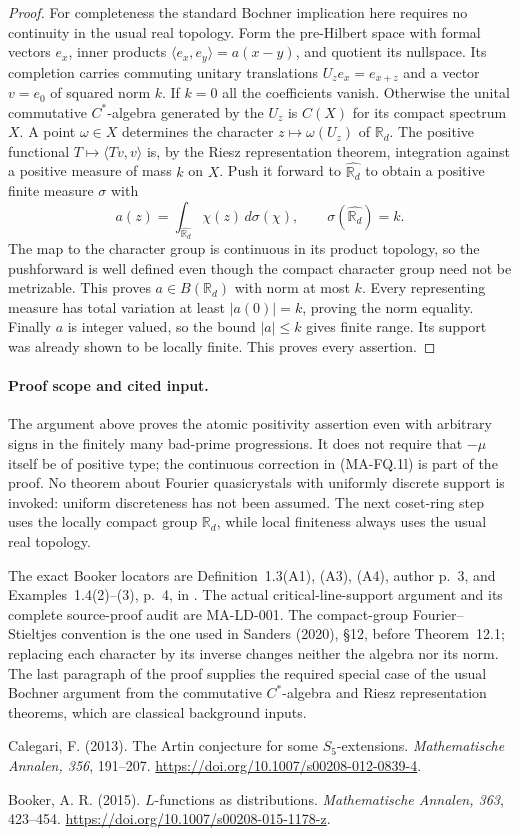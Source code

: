 \begin{proof}
For completeness the standard Bochner implication here requires
no continuity in the usual real topology. Form the pre-Hilbert
space with formal vectors $e_x$, inner products
$\langle e_x,e_y\rangle=a(x-y)$, and quotient its nullspace.
Its completion carries commuting unitary translations
$U_z e_x=e_{x+z}$ and a vector $v=e_0$ of squared norm $k$.
If $k=0$ all the coefficients vanish. Otherwise the unital
commutative $C^*$-algebra generated by the $U_z$ is $C(X)$
for its compact spectrum $X$. A point $\omega\in X$ determines
the character $z\mapsto\omega(U_z)$ of $\mathbb R_d$.
The positive functional $T\mapsto\langle Tv,v\rangle$ is,
by the Riesz representation theorem, integration against a
positive measure of mass $k$ on $X$. Push it forward to
$\widehat{\mathbb R_d}$ to obtain a positive finite measure
$\sigma$ with
\[
        a(z)=\int_{\widehat{\mathbb R_d}}\chi(z)\,d\sigma(\chi),
        \qquad \sigma(\widehat{\mathbb R_d})=k.
 \tag{MA-FQ.1p}
\]
The map to the character group is continuous in its product
topology, so the pushforward is well defined even though the
compact character group need not be metrizable. This proves
$a\in B(\mathbb R_d)$ with norm at most $k$. Every representing
measure has total variation at least $|a(0)|=k$, proving the
norm equality. Finally $a$ is integer valued, so the bound
$|a|\le k$ gives finite range. Its support was already shown
to be locally finite. This proves every assertion.
\end{proof}

\paragraph{Proof scope and cited input.}
The argument above proves the atomic positivity assertion even
with arbitrary signs in the finitely many bad-prime progressions.
It does not require that $-\mu$ itself be of positive type;
the continuous correction in (MA-FQ.1l) is part of the proof.
No theorem about Fourier quasicrystals with uniformly discrete
support is invoked: uniform discreteness has not been assumed.
The next coset-ring step uses the locally compact group
$\mathbb R_d$, while local finiteness always uses the usual
real topology.

The exact Booker locators are Definition~1.3(A1), (A3), (A4),
author p.~3, and Examples~1.4(2)--(3), p.~4, in
. The actual critical-line-support
argument and its complete source-proof audit are MA-LD-001.
The compact-group Fourier--Stieltjes convention is the one used
in Sanders (2020), \S12, before Theorem~12.1; replacing each
character by its inverse changes neither the algebra nor its norm.
The last paragraph of the proof supplies the required special
case of the usual Bochner argument from the commutative
$C^*$-algebra and Riesz representation theorems, which are
classical background inputs.

Calegari, F. (2013). The Artin conjecture for some $S_5$-extensions.
\emph{Mathematische Annalen, 356}, 191--207.
\url{https://doi.org/10.1007/s00208-012-0839-4}.

Booker, A. R. (2015). $L$-functions as distributions.
\emph{Mathematische Annalen, 363}, 423--454.
\url{https://doi.org/10.1007/s00208-015-1178-z}.

